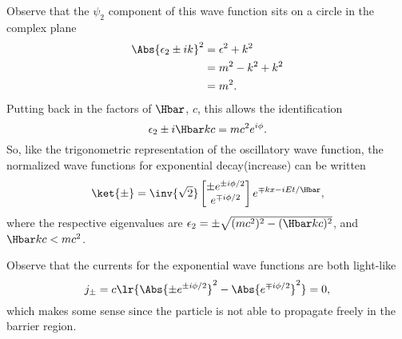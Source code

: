 \begin{enumerate}[(i)]
Observe that the \( \psi_2 \) component of this wave function sits on a circle in the complex plane
%
\begin{equation}\label{eqn:gradQuantumProblemSet4Problem3:1101}
\begin{aligned}
\Abs{\epsilon_2 \pm i k}^2
&= \epsilon^2 + k^2
\\ &= m^2 - k^2 + k^2
\\ &= m^2.
\end{aligned}
\end{equation}
%
Putting back in the factors of \( \Hbar \), \( c\), this allows the identification
%
\begin{equation}\label{eqn:gradQuantumProblemSet4Problem3:1121}
\epsilon_2 \pm i \Hbar k c = m c^2 e^{i\phi}.
\end{equation}
%
So, like the trigonometric representation of the oscillatory wave function, the normalized wave functions for exponential decay(increase) can be written
%
\begin{equation}\label{eqn:gradQuantumProblemSet4Problem3:1141}
\ket{\pm}
=
\inv{\sqrt{2}}
\begin{bmatrix}
\pm e^{\pm i \phi/2} \\
e^{\mp i \phi/2}
\end{bmatrix}
e^{\mp k x - i E t/\Hbar}
,
\end{equation}
%
where the respective eigenvalues are \( \epsilon_2 = \pm \sqrt{ (m c^2)^2 - (\Hbar k c)^2} \), and \( \Hbar k c < m c^2 \).

Observe that the currents for the exponential wave functions are both light-like
%
\begin{equation}\label{eqn:gradQuantumProblemSet4Problem3:1161}
j_{\pm} = c \lr{ \Abs{\pm e^{\pm i \phi/2}}^2 - \Abs{e^{\mp i \phi/2}}^2 } = 0,
\end{equation}
%
which makes some sense since the particle is not able to propagate freely in the barrier region.


\end{enumerate}
